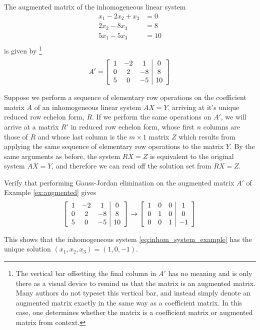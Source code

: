 \documentclass[12pt,letterpaper,reqno]{article}
\numberwithin{equation}{section}
\begin{document}
\begin{example}\label{ex:augmented}
The augmented matrix of the inhomogeneous linear system
\begin{equation}\label{eq:inhom_system_example}
\begin{split}
	x_1-2x_2+x_3&=0 \\
	2x_2-8x_3&=8 \\
	5x_1-5x_3&=10 \\
\end{split}
\end{equation}
is given by \footnote{The vertical bar offsetting the final column in $A'$ has no meaning and is only there as a visual device to remind us that the matrix is an augmented matrix. Many authors do not typeset this vertical bar, and instead simply denote an augmented matrix exactly in the same way as a coefficient matrix. In this case, one determines whether the matrix is a coefficient matrix or augmented matrix from context.}
\begin{align*}
	A'=\left[\begin{array}{c c c | c}
		1&-2&1&0 \\
		0&2&-8&8 \\
		5&0&-5&10
	\end{array}\right]
\end{align*}	
\end{example}


Suppose we perform a sequence of elementary row operations on the coefficient matrix $A$ of an inhomogeneous linear system $AX=Y$, arriving at it's unique reduced row echelon form, $R$. If we perform the same operations on $A'$, we will arrive at a matrix $R'$ in reduced row echelon form, whose first $n$ columns are those of $R$ and whose last column is the $m \times 1$ matrix $Z$ which results from applying the same sequence of elementary row operations to the matrix $Y$. By the same arguments as before, the system $RX=Z$ is equivalent to the original system $AX=Y$, and therefore we can read off the solution set from $RX=Z$.

\begin{exercise}
Verify that performing Gauss-Jordan elimination on the augmented matrix $A'$ of Example \ref{ex:augmented} gives
\begin{align*}
	\left[\begin{array}{c c c | c}
		1&-2&1&0 \\
		0&2&-8&8 \\
		5&0&-5&10
	\end{array}\right] \to \left[\begin{array}{c c c | c}
		1&0&0&1 \\
		0&1&0&0 \\
		0&0&1&-1
	\end{array}\right]
\end{align*}
	
This shows that the inhomogeneous system \eqref{eq:inhom_system_example} has the unique solution $(x_1,x_2,x_3)=(1,0,-1)$.
\end{exercise}
\end{document}
